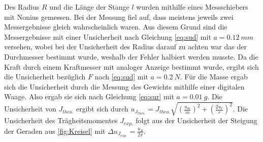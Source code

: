 Des Radius $R$ und die Länge der Stange $l$ wurden mithilfe eines Messschiebers mit Nonius gemessen. Bei der Messung fiel auf, dass meistens jeweils  zwei Messergebnisse gleich wahrscheinlich  waren. Aus diesem Grund sind die Messergebnisse mit einer Unsicherheit nach Gleichung \ref{eq:sud} mit $a=\SI{0,12}{mm}$ versehen, wobei bei der Unsicherheit des Radius darauf zu achten war das der Durchmesser bestimmt wurde, weshalb der Fehler halbiert werden musste. Da die Kraft durch einem Kraftmesser mit analoger Anzeige bestimmt wurde, ergibt sich die Unsicherheit bezüglich $F$ nach \ref{eq:sud} mit $a=\SI{0,2}{N}$. Für die Masse  ergab sich die Unsicherheit durch die Messung des Gewichts mithilfe einer digitalen Waage. Also ergab sie sich nach Gleichung \ref{eq:sur} mit $a=\SI{0,01}{g}$. 
Die Unsicherheit von $J_{theo.}$ ergibt sich durch $u_{J_{theo.}}=J_{theo.}\sqrt{\left(\frac{u_m}{m}\right)^2+\left(\frac{2u_r}{r}\right)^2}$.
Die Unsicherheit des Trägheitsmomentes $J_{exp.}$ folgt aus der Unsicherheit der Steigung der Geraden aus \cref{fig:Kreisel} mit $\Delta u_{J_{exp.}}=\frac{u_S}{2  \pi}$.

